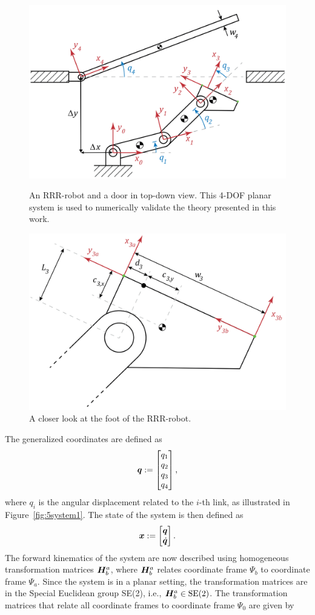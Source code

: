 \documentclass[../DC2019003Bouma.tex]{subfiles}
\begin{document}
%
%
\begin{figure}[bt!]
\centering
\includegraphics[width=.7\textwidth]{system.PNG}\caption{An RRR-robot and a door in top-down view. This 4-DOF planar system is used to numerically validate the theory presented in this work.}\label{fig:5system1}
\includegraphics[width=.7\textwidth]{system2.PNG}\caption{A closer look at the foot of the RRR-robot.}
\label{fig:5system2}
\end{figure}

The generalized coordinates are defined as 
\begin{align}
{\boldsymbol{q}} := \begin{bmatrix}
q_1\\q_2\\q_3\\q_4
\end{bmatrix},
\end{align}
where $q_i$ is the angular displacement related to the $i$-th link, as illustrated in Figure~\ref{fig:5system1}. The state of the system is then defined as
\begin{align}
{\boldsymbol{x}} := \begin{bmatrix}
{\boldsymbol{q}}\\\dot{{\boldsymbol{q}}}
\end{bmatrix}.
\end{align}
The forward kinematics of the system are now described using homogeneous transformation matrices ${\boldsymbol{H}}^a_b$, where ${\boldsymbol{H}}^a_b$ relates coordinate frame $\Psi_b$ to coordinate frame $\Psi_a$. Since the system is in a planar setting, the transformation matrices are in the Special Euclidean group SE(2), i.e., ${\boldsymbol{H}}^a_b\in \textnormal{SE}(2)$. The transformation matrices that relate all coordinate frames to coordinate frame $\Psi_0$ are given by
\end{document}
